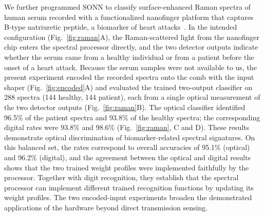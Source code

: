 \documentclass[11pt]{article}
\begin{document}
We further programmed SONN to classify surface-enhanced Raman spectra of human serum recorded with a functionalized nanofinger platform that captures B-type natriuretic peptide, a biomarker of heart attacks~\cite{zhang2025nanofinger,liu2023}. In the intended configuration (Fig.~\ref{fig:raman}A), the Raman-scattered light from the nanofinger chip enters the spectral processor directly, and the two detector outputs indicate whether the serum came from a healthy individual or from a patient before the onset of a heart attack. Because the serum samples were not available to us, the present experiment encoded the recorded spectra onto the comb with the input shaper (Fig.~\ref{fig:encoded}A) and evaluated the trained two-output classifier on 288 spectra (144 healthy, 144 patient), each from a single optical measurement of the two detector outputs (Fig.~\ref{fig:raman}B). The optical classifier identified 96.5\% of the patient spectra and 93.8\% of the healthy spectra; the corresponding digital rates were 93.8\% and 98.6\% (Fig.~\ref{fig:raman}, C and D). These results demonstrate optical discrimination of biomarker-related spectral signatures. On this balanced set, the rates correspond to overall accuracies of 95.1\% (optical) and 96.2\% (digital), and the agreement between the optical and digital results shows that the two trained weight profiles were implemented faithfully by the processor. Together with digit recognition, they establish that the spectral processor can implement different trained recognition functions by updating its weight profiles. The two encoded-input experiments broaden the demonstrated applications of the hardware beyond direct transmission sensing.
\end{document}
